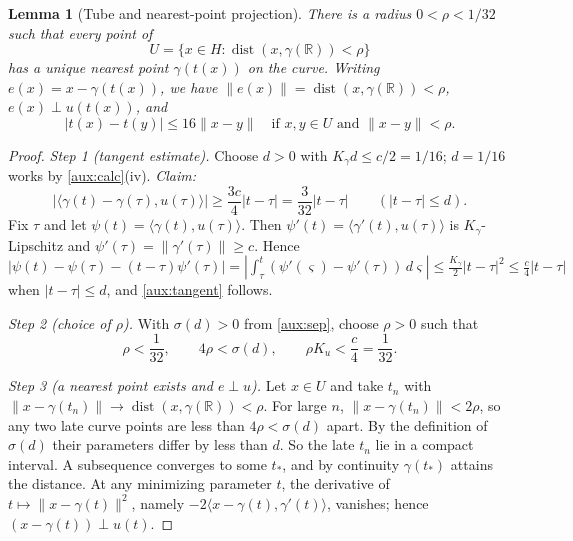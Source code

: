\documentclass[11pt]{article}
\newcommand{\R}{\mathbb R}
\newcommand{\norm}[1]{\lVert #1\rVert}
\newcommand{\ip}[2]{\langle #1,#2\rangle}
\DeclareMathOperator{\dist}{dist}
\newtheorem{lemma}[theorem]{Lemma}
\theoremstyle{definition}
\numberwithin{equation}{section}
\begin{document}
\begin{lemma}[Tube and nearest-point projection]\label{aux:tube}
There is a radius \(0<\rho<1/32\) such that every point of
\[
 U=\{x\in H:\dist(x,\gamma(\R))<\rho\}
\]
has a unique nearest point \(\gamma(t(x))\) on the curve. Writing
\(e(x)=x-\gamma(t(x))\), we have \(\norm{e(x)}=\dist(x,\gamma(\R))<\rho\),
\(e(x)\perp u(t(x))\), and
\begin{equation}\label{aux:parameter}
 |t(x)-t(y)|\le16\norm{x-y}
 \quad\text{if }x,y\in U\text{ and }\norm{x-y}<\rho.
\end{equation}
\end{lemma}

\begin{proof}
\emph{Step 1 (tangent estimate).} Choose \(d>0\) with
\(K_\gamma d\le c/2=1/16\); \(d=1/16\) works by \cref{aux:calc}(iv).
\emph{Claim:}
\begin{equation}\label{aux:tangent}
 |\ip{\gamma(t)-\gamma(\tau)}{u(\tau)}|
 \ge\frac{3c}{4}|t-\tau|=\frac{3}{32}|t-\tau|
 \qquad(|t-\tau|\le d).
\end{equation}
Fix \(\tau\) and let \(\psi(t)=\ip{\gamma(t)}{u(\tau)}\). Then
\(\psi'(t)=\ip{\gamma'(t)}{u(\tau)}\) is \(K_\gamma\)-Lipschitz and
\(\psi'(\tau)=\norm{\gamma'(\tau)}\ge c\). Hence
\(|\psi(t)-\psi(\tau)-(t-\tau)\psi'(\tau)|
=|\int_\tau^t(\psi'(\varsigma)-\psi'(\tau))\,d\varsigma|
\le\frac{K_\gamma}2|t-\tau|^2\le\frac c4|t-\tau|\) when \(|t-\tau|\le d\), and
\eqref{aux:tangent} follows.

\emph{Step 2 (choice of \(\rho\)).} With \(\sigma(d)>0\) from \cref{aux:sep},
choose \(\rho>0\) such that
\begin{equation}\label{aux:radius}
 \rho<\frac1{32},\qquad 4\rho<\sigma(d),\qquad \rho K_u<\frac c4=\frac1{32}.
\end{equation}

\emph{Step 3 (a nearest point exists and \(e\perp u\)).} Let \(x\in U\) and
take \(t_n\) with \(\norm{x-\gamma(t_n)}\to\dist(x,\gamma(\R))<\rho\). For
large \(n\), \(\norm{x-\gamma(t_n)}<2\rho\), so any two late curve points are
less than \(4\rho<\sigma(d)\) apart. By the definition of \(\sigma(d)\) their
parameters differ by less than \(d\). So the late \(t_n\) lie in a compact
interval. A subsequence converges to some \(t_*\), and by continuity
\(\gamma(t_*)\) attains the distance. At any minimizing parameter \(t\), the
derivative of \(t\mapsto\norm{x-\gamma(t)}^2\), namely
\(-2\ip{x-\gamma(t)}{\gamma'(t)}\), vanishes; hence
\((x-\gamma(t))\perp u(t)\).


\end{proof}
\end{document}
